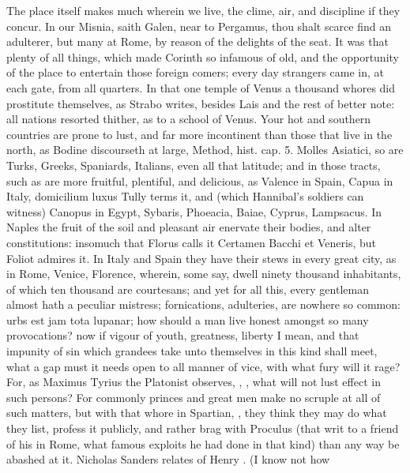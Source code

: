 {The place itself makes much wherein we live, the clime, air, and
discipline if they concur. In our Misnia, saith Galen, near to
Pergamus, thou shalt scarce find an adulterer, but many at Rome, by
reason of the delights of the seat. It was that plenty of all things,
which made Corinth so infamous of old, and the opportunity of the
place to entertain those foreign comers; every day strangers came in,
at each gate, from all quarters. In that one temple of Venus a thousand
whores did prostitute themselves, as Strabo writes, besides Lais and
the rest of better note: all nations resorted thither, as to a school
of Venus. Your hot and southern countries are prone to lust, and far
more incontinent than those that live in the north, as Bodine
discourseth at large, Method, hist. cap. 5. Molles Asiatici, so are
Turks, Greeks, Spaniards, Italians, even all that latitude; and in
those tracts, such as are more fruitful, plentiful, and delicious, as
Valence in Spain, Capua in Italy, domicilium luxus Tully terms it, and
(which Hannibal's soldiers can witness) Canopus in Egypt, Sybaris,
Phoeacia, Baiae, Cyprus, Lampsacus. In Naples the fruit of
the soil and pleasant air enervate their bodies, and alter
constitutions: insomuch that Florus calls it Certamen Bacchi et
Veneris, but Foliot admires it. In Italy and Spain they have
their stews in every great city, as in Rome, Venice, Florence, wherein,
some say, dwell ninety thousand inhabitants, of which ten thousand are
courtesans; and yet for all this, every gentleman almost hath a
peculiar mistress; fornications, adulteries, are nowhere so common:
urbs est jam tota lupanar; how should a man live honest amongst so many
provocations? now if vigour of youth, greatness, liberty I mean, and
that impunity of sin which grandees take unto themselves in this kind
shall meet, what a gap must it needs open to all manner of vice, with
what fury will it rage? For, as Maximus Tyrius the Platonist observes,
, \etc{}, what will not lust effect in
such persons? For commonly princes and great men make no scruple at all
of such matters, but with that whore in Spartian, ,
they think they may do what they list, profess it publicly, and rather
brag with Proculus (that writ to a friend of his in Rome, what
famous exploits he had done in that kind) than any way be abashed at
it. Nicholas Sanders relates of Henry . (I know not how
}
